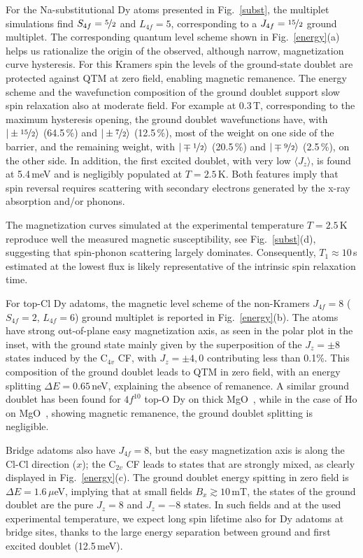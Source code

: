 {For the Na-substitutional Dy atoms presented in Fig.~\ref{subst},  the multiplet simulations find $S_{4f} = \nicefrac{5}{2}$ and $L_{4f} = 5$, corresponding to a $J_{4f} = \nicefrac{15}{2}$ ground multiplet. The corresponding quantum level scheme shown in Fig.~\ref{energy}(a) helps us rationalize the origin of the observed, although narrow, magnetization curve hysteresis.
For this Kramers spin the levels of the ground-state doublet are protected against QTM at zero field, enabling magnetic remanence. The energy scheme and the wavefunction composition of the ground doublet support slow spin relaxation also at moderate field.
For example at 0.3\,T, corresponding to the maximum hysteresis opening, the ground doublet wavefunctions have, with $|\pm \nicefrac{15}{2} \rangle$ (64.5\,\%) and $|\pm \nicefrac{7}{2} \rangle$ (12.5\,\%), most of the weight on one side of the barrier, and the remaining weight, with  $|\mp \nicefrac{1}{2} \rangle$ (20.5\,\%) and $|\mp \nicefrac{9}{2} \rangle$ (2.5\,\%), on the other side. In addition, the first excited doublet, with very low $\langle J_z \rangle$, is found at 5.4\,meV and is negligibly populated at $T=2.5$\,K. Both features imply that spin reversal requires scattering with secondary electrons generated by the x-ray absorption and/or phonons.

The magnetization curves simulated at the experimental temperature $T=2.5$\,K reproduce well the measured magnetic susceptibility, see Fig.~\ref{subst}(d), suggesting that spin-phonon scattering largely dominates. Consequently,  $T_1 \approx 10$\,s  estimated at the lowest flux is likely representative of the intrinsic spin relaxation time.

For top-Cl Dy adatoms, the magnetic level scheme of the non-Kramers $J_{4f} = 8$  ($S_{4f} = 2$, $L_{4f} = 6$) ground multiplet is reported in Fig.~\ref{energy}(b). The atoms have strong out-of-plane easy magnetization axis, as seen in the polar plot  in the inset, with the ground state mainly given by the superposition of the $J_z  = \pm 8$ states induced by the C$_{4v}$ CF, with $J_z  = \pm 4, 0$ contributing less than 0.1\%.  This composition of the ground doublet leads to QTM in zero field, with an energy splitting $\Delta E = 0.65$\,neV,  explaining the absence of remanence. A similar ground doublet has been found for $4f^{10}$ top-O Dy on thick MgO~\cite{don21}, while in the case of Ho on MgO~\cite{sin21b}, showing magnetic remanence, the ground doublet splitting is negligible.

Bridge adatoms also have $J_{4f} = 8$, but the easy magnetization  axis is along the Cl-Cl direction ($x$); the C$_{2v}$ CF leads to states that are strongly mixed, as clearly displayed in Fig.~\ref{energy}(c). The ground doublet energy spitting in zero field is $\Delta E = 1.6$\,$\mu$eV, implying that at small fields $B_x \gtrsim 10$\,mT, the states of the ground doublet are the pure $J_z= 8$ and $J_z=-8$ states. In such fields and at the used experimental temperature, we expect long spin lifetime also for Dy adatoms at bridge sites, thanks to the large energy separation between ground and first excited doublet (12.5\,meV).

}
